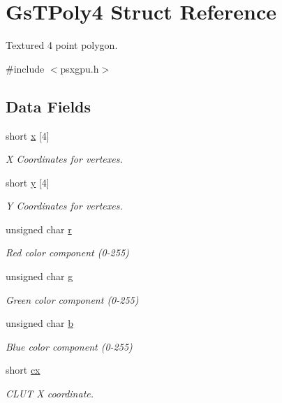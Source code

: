 \hypertarget{structGsTPoly4}{}\section{Gs\+T\+Poly4 Struct Reference}
\label{structGsTPoly4}


Textured 4 point polygon.  




{\ttfamily \#include $<$psxgpu.\+h$>$}

\subsection*{Data Fields}
\begin{DoxyCompactItemize}
\item 
short \hyperlink{structGsTPoly4_a6348d047a5123bf2c7b6d70d96d216ae}{x} \mbox{[}4\mbox{]}
\begin{DoxyCompactList}\small\item\em X Coordinates for vertexes. \end{DoxyCompactList}\item 
short \hyperlink{structGsTPoly4_a0a64e0d7ce40b4a5690b5af814c4fd7d}{y} \mbox{[}4\mbox{]}
\begin{DoxyCompactList}\small\item\em Y Coordinates for vertexes. \end{DoxyCompactList}\item 
unsigned char \hyperlink{structGsTPoly4_a0fc04cf3a1c90b8e4b672908ba6cbd24}{r}
\begin{DoxyCompactList}\small\item\em Red color component (0-\/255) \end{DoxyCompactList}\item 
unsigned char \hyperlink{structGsTPoly4_a4fe23fe98949d3fc80cc851cf32f0f4e}{g}
\begin{DoxyCompactList}\small\item\em Green color component (0-\/255) \end{DoxyCompactList}\item 
unsigned char \hyperlink{structGsTPoly4_ab63bd47c343b40ec9a63e0d4a726cecc}{b}
\begin{DoxyCompactList}\small\item\em Blue color component (0-\/255) \end{DoxyCompactList}\item 
short \hyperlink{structGsTPoly4_a594a5d5e85f45941aac5187ff2dde2d2}{cx}
\begin{DoxyCompactList}\small\item\em C\+L\+U\+T X coordinate. \end{DoxyCompactList}\item 

\end{DoxyCompactItemize}
